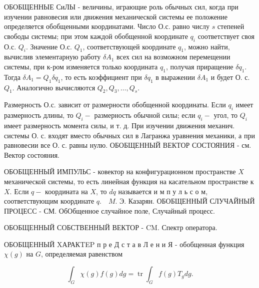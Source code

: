 \documentclass[10pt]{article}
\begin{document}
ОБОБЩЕННЫЕ СиЛЫ - величины, играющие роль обычных сил, когда при изучении равновесия или движения механической системы ее положение определяется обобщенными координатами. Число О.с. равно числу $s$ степеней свободы системы; при этом каждой обобщенной координате $q_{i}$ соответствует своя О.с. $Q_{i}$. Значение О.с. $Q_{1}$, соответствующей координате $q_{1}$, можно найти, вычислив элементарную работу $\delta A_{1}$ всех сил на возможном перемещении системы, при к-ром изменяется только координата $q_{1}$, получая приращение $\delta q_{1}$. Тогда $\delta A_{1}=Q_{1} \delta q_{1}$, то есть коэффициент при $\delta q_{1}$ в выражении $\delta A_{1}$ и будет О. с. $Q_{1}$. Аналогично вычисляются $Q_{2}, Q_{3}, \ldots, Q_{s}$.



Размерность О.с. зависит от размерности обобщенной координаты. Если $q_{i}$ имеет размерность длины, то $Q_{i}-$ размерность обычной силы; если $q_{i}-$ угол, то $Q_{i}$ имеет размерность момента силы, и т. д. При изучении движения механич. системы О. с. входят вместо обычных сил в Лагранжа уравнения механики, а при равновесии все О. с. равны нулю. ОБОБЩЕННЫЙ ВЕКТОР СОСТОЯНИЯ - см. Вектор состояния.



ОБОБЩЕННЫЙ ИМПУЛЬС - ковектор на конфигурационном пространстве $X$ механической системы, то есть линейная функция на касательном пространстве к $X$. Если $q-$ координата на $X$, то $d q$ называется и м п у л ь с о м, соответствующим координате $q . \quad M$. Э. Казарян. ОБОБЩЕННЫЙ СЛУЧАЙНЫЙ ПРОЦЕСС - СМ. ОбОбщенное случайное поле, Случайный процесс.



ОБОБЩЕННЫЙ СОБСТВЕННЫЙ ВЕКТОР - $\mathrm{CM}$. Спектр оператора.



ОБОБЩЕННЫЙ XАРАКTEP п р е Д с т а в Л е н и Я - обобщенная функция $\chi(g)$ на $G$, определяемая равенством



\[

\int_{G} \chi(g) f(g) d g=\operatorname{tr} \int_{G} f(g) T_{g} d g .

\]
\end{document}
